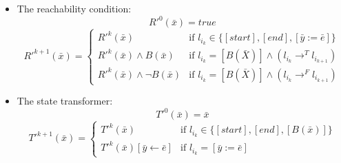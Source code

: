 \documentclass{article}
\begin{document}
\section{}
\begin{itemize}
    \item The reachability condition:
    \[
        R'^0(\bar{x})=true
    \]
    \[
        R'^{k+1}(\bar{x})=
        \begin{cases}
            R'^k(\bar{x}) & \text{if } l_{i_k}\in\{[start], [end], [\bar{y}:=\bar{e}]\}\\
            R'^k(\bar{x})\wedge B(\bar{x}) & \text{if } l_{i_k}=[B(\bar{X})]\wedge (l_{i_k}\rightarrow^Tl_{i_{k+1}})\\
            R'^k(\bar{x})\wedge \neg B(\bar{x}) & \text{if } l_{i_k}=[B(\bar{X})]\wedge (l_{i_k}\rightarrow^Fl_{i_{k+1}})

        \end{cases}    
    \]
    \item The state transformer:
    \[
        T'^0(\bar{x})=\bar{x}    
    \]
    \[
        T'^{k+1}(\bar{x})=
        \begin{cases}
            T'^k(\bar{x}) & \text{if } l_{i_k}\in\{[start], [end], [B(\bar{x})]\}\\
            T'^k(\bar{x})[\bar{y}\leftarrow\bar{e}] & \text{if } l_{i_k}=[\bar{y}:=\bar{e}]
        \end{cases}    
    \]
\end{itemize}
\end{document}
